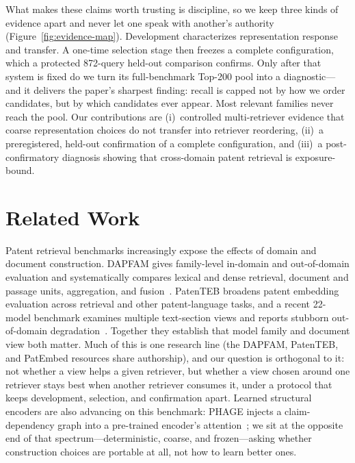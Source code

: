 \documentclass[a4paper,conference]{IEEEtran}
\begin{document}
What makes these claims worth trusting is discipline, so we keep three kinds of evidence apart and never let one speak with another's authority (Figure~\ref{fig:evidence-map}). Development characterizes representation response and transfer. A one-time selection stage then freezes a complete configuration, which a protected 872-query held-out comparison confirms. Only after that system is fixed do we turn its full-benchmark Top-200 pool into a diagnostic---and it delivers the paper's sharpest finding: recall is capped not by how we order candidates, but by which candidates ever appear. Most relevant families never reach the pool. Our contributions are (i)~controlled multi-retriever evidence that coarse representation choices do not transfer into retriever reordering, (ii)~a preregistered, held-out confirmation of a complete configuration, and (iii)~a post-confirmatory diagnosis showing that cross-domain patent retrieval is exposure-bound.

\section{Related Work}
\label{sec:related}

Patent retrieval benchmarks increasingly expose the effects of domain and document construction. DAPFAM gives family-level in-domain and out-of-domain evaluation and systematically compares lexical and dense retrieval, document and passage units, aggregation, and fusion~\cite{ayaou2026dapfam}. PatenTEB broadens patent embedding evaluation across retrieval and other patent-language tasks, and a recent 22-model benchmark examines multiple text-section views and reports stubborn out-of-domain degradation~\cite{ayaou2025patenteb,yousefiramandi2026patent}. Together they establish that model family and document view both matter. Much of this is one research line (the DAPFAM, PatenTEB, and PatEmbed resources share authorship), and our question is orthogonal to it: not whether a view helps a given retriever, but whether a view chosen around one retriever stays best when another retriever consumes it, under a protocol that keeps development, selection, and confirmation apart. Learned structural encoders are also advancing on this benchmark: PHAGE injects a claim-dependency graph into a pre-trained encoder's attention~\cite{phage2026}; we sit at the opposite end of that spectrum---deterministic, coarse, and frozen---asking whether construction choices are portable at all, not how to learn better ones.
\end{document}
